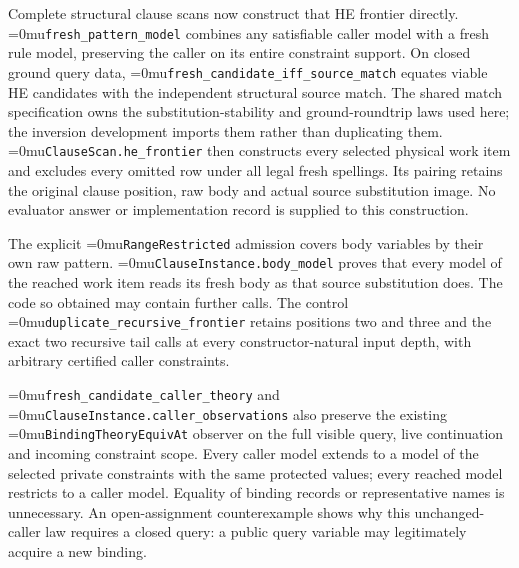 \documentclass[11pt,a4paper]{article}
\newcommand{\name}[1]{\textup{\Urlmuskip=0mu\relax\nolinkurl{#1}}}
\begin{document}
Complete structural clause scans now construct that HE frontier directly.
\name{fresh\_pattern\_model} combines any satisfiable caller model with a
fresh rule model, preserving the caller on its entire constraint support.
On closed ground query data,
\name{fresh\_candidate\_iff\_source\_match} equates viable HE candidates
with the independent structural source match. The shared match specification
owns the substitution-stability and ground-roundtrip laws used here; the
inversion development imports them rather than duplicating them.
\name{ClauseScan.he\_frontier} then constructs every selected physical
work item and excludes every omitted row under all legal fresh spellings.
Its pairing retains the original clause position, raw body and actual source
substitution image. No evaluator answer or implementation record is supplied
to this construction.

The explicit \name{RangeRestricted} admission covers body variables by their
own raw pattern. \name{ClauseInstance.body\_model} proves that every model of
the reached work item reads its fresh body as that source substitution does.
The code so obtained may contain further calls. The control
\name{duplicate\_recursive\_frontier} retains positions two and three and
the exact two recursive tail calls at every constructor-natural input depth,
with arbitrary certified caller constraints.

\name{fresh\_candidate\_caller\_theory} and
\name{ClauseInstance.caller\_observations} also preserve the existing
\name{BindingTheoryEquivAt} observer on the full visible query, live
continuation and incoming constraint scope. Every caller model extends to a
model of the selected private constraints with the same protected values;
every reached model restricts to a caller model. Equality of binding records
or representative names is unnecessary. An open-assignment counterexample
shows why this unchanged-caller law requires a closed query: a public query
variable may legitimately acquire a new binding.
\end{document}
